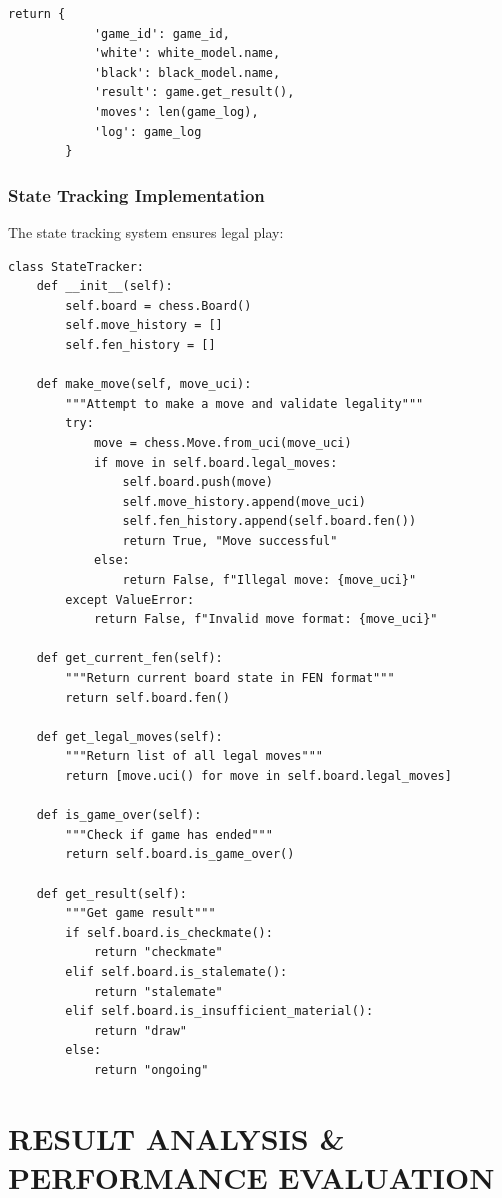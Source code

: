\documentclass[11pt,a4paper]{report}
\begin{document}
\begin{lstlisting}[style=Python]
        return {
            'game_id': game_id,
            'white': white_model.name,
            'black': black_model.name,
            'result': game.get_result(),
            'moves': len(game_log),
            'log': game_log
        }
\end{lstlisting}

\subsection{State Tracking Implementation}
The state tracking system ensures legal play:

\begin{lstlisting}[style=Python]
class StateTracker:
    def __init__(self):
        self.board = chess.Board()
        self.move_history = []
        self.fen_history = []
        
    def make_move(self, move_uci):
        """Attempt to make a move and validate legality"""
        try:
            move = chess.Move.from_uci(move_uci)
            if move in self.board.legal_moves:
                self.board.push(move)
                self.move_history.append(move_uci)
                self.fen_history.append(self.board.fen())
                return True, "Move successful"
            else:
                return False, f"Illegal move: {move_uci}"
        except ValueError:
            return False, f"Invalid move format: {move_uci}"
            
    def get_current_fen(self):
        """Return current board state in FEN format"""
        return self.board.fen()
        
    def get_legal_moves(self):
        """Return list of all legal moves"""
        return [move.uci() for move in self.board.legal_moves]
        
    def is_game_over(self):
        """Check if game has ended"""
        return self.board.is_game_over()
        
    def get_result(self):
        """Get game result"""
        if self.board.is_checkmate():
            return "checkmate"
        elif self.board.is_stalemate():
            return "stalemate"
        elif self.board.is_insufficient_material():
            return "draw"
        else:
            return "ongoing"
\end{lstlisting}

\chapter{RESULT ANALYSIS \& PERFORMANCE EVALUATION}
\thispagestyle{fancy}
\end{document}
